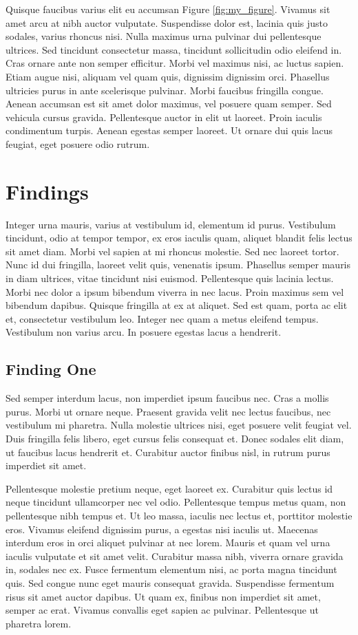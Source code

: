 \documentclass[11pt]{article}           %
\begin{document}
\begin{multicols}{2}
Quisque faucibus varius elit eu accumsan Figure \ref{fig:my_figure}. Vivamus sit amet arcu at nibh auctor vulputate. Suspendisse dolor est, lacinia quis justo sodales, varius rhoncus nisi. Nulla maximus urna pulvinar dui pellentesque ultrices. Sed tincidunt consectetur massa, tincidunt sollicitudin odio eleifend in. Cras ornare ante non semper efficitur. Morbi vel maximus nisi, ac luctus sapien. Etiam augue nisi, aliquam vel quam quis, dignissim dignissim orci. Phasellus ultricies purus in ante scelerisque pulvinar. Morbi faucibus fringilla congue. Aenean accumsan est sit amet dolor maximus, vel posuere quam semper. Sed vehicula cursus gravida. Pellentesque auctor in elit ut laoreet. Proin iaculis condimentum turpis. Aenean egestas semper laoreet. Ut ornare dui quis lacus feugiat, eget posuere odio rutrum.

\section{Findings}

Integer urna mauris, varius at vestibulum id, elementum id purus. Vestibulum tincidunt, odio at tempor tempor, ex eros iaculis quam, aliquet blandit felis lectus sit amet diam. Morbi vel sapien at mi rhoncus molestie. Sed nec laoreet tortor. Nunc id dui fringilla, laoreet velit quis, venenatis ipsum. Phasellus semper mauris in diam ultrices, vitae tincidunt nisi euismod. Pellentesque quis lacinia lectus. Morbi nec dolor a ipsum bibendum viverra in nec lacus. Proin maximus sem vel bibendum dapibus. Quisque fringilla at ex at aliquet. Sed est quam, porta ac elit et, consectetur vestibulum leo. Integer nec quam a metus eleifend tempus. Vestibulum non varius arcu. In posuere egestas lacus a hendrerit.

\subsection{Finding One}

Sed semper interdum lacus, non imperdiet ipsum faucibus nec. Cras a mollis purus. Morbi ut ornare neque. Praesent gravida velit nec lectus faucibus, nec vestibulum mi pharetra. Nulla molestie ultrices nisi, eget posuere velit feugiat vel. Duis fringilla felis libero, eget cursus felis consequat et. Donec sodales elit diam, ut faucibus lacus hendrerit et. Curabitur auctor finibus nisl, in rutrum purus imperdiet sit amet.

Pellentesque molestie pretium neque, eget laoreet ex. Curabitur quis lectus id neque tincidunt ullamcorper nec vel odio. Pellentesque tempus metus quam, non pellentesque nibh tempus et. Ut leo massa, iaculis nec lectus et, porttitor molestie eros. Vivamus eleifend dignissim purus, a egestas nisi iaculis ut. Maecenas interdum eros in orci aliquet pulvinar at nec lorem. Mauris et quam vel urna iaculis vulputate et sit amet velit. Curabitur massa nibh, viverra ornare gravida in, sodales nec ex. Fusce fermentum elementum nisi, ac porta magna tincidunt quis. Sed congue nunc eget mauris consequat gravida. Suspendisse fermentum risus sit amet auctor dapibus. Ut quam ex, finibus non imperdiet sit amet, semper ac erat. Vivamus convallis eget sapien ac pulvinar. Pellentesque ut pharetra lorem.


\end{multicols}
\end{document}

